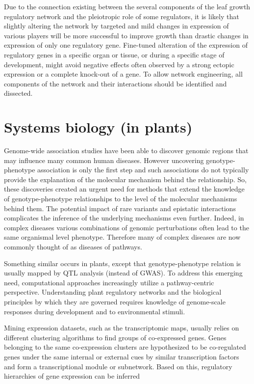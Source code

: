 \documentclass[a4paper,10pt]{article}
\begin{document}
\begin{description}
Due to the connection existing between the several components of the leaf growth regulatory network and the pleiotropic role of some regulators,
it is likely that slightly altering the network by targeted and mild changes in expression of various players will be more successful to improve growth than drastic changes in expression of only one regulatory gene. 
Fine-tuned alteration of the expression of regulatory genes in a specific organ or tissue, or during a specific stage of development, might avoid negative effects often observed by a strong ectopic expression or a complete knock-out of a gene.
To allow network engineering, all components of the network and their interactions should be identified and dissected.


\end{description}


\section{Systems biology (in plants)}
Genome-wide association studies have been able to discover genomic regions that may influence many common human diseases. 
However uncovering genotype-phenotype association is only the first step and such associations do not typically provide the explanation of the molecular mechanism behind the relationship.
So, these discoveries created an urgent need for methods that extend the knowledge of genotype-phenotype relationships to the level of the molecular mechanisms behind them.
The potential impact of rare variants and epistatic interactions complicates the inference of the underlying mechanisms even further.
Indeed, in complex diseases various combinations of genomic perturbations often lead to the same organismal level phenotype. Therefore many of complex diseases are now commonly thought of as diseases of pathways.

Something similar occurs in plants, except that genotype-phenotype relation is usually mapped by QTL analysis (instead of GWAS).
To address this emerging need, computational approaches increasingly utilize a pathway-centric perspective.
Understanding plant regulatory networks and the biological principles by which they are governed requires knowledge of genome-scale responses during development and to environmental stimuli.

Mining expression datasets, such as the transcriptomic maps, usually relies on different clustering algorithms to find groups of co-expressed genes. 
Genes belonging to the same co-expression clusters are hypothesized to be co-regulated genes under the same internal or external cues by similar transcription factors and form a transcriptional module or subnetwork.
Based on this, regulatory hierarchies of gene expression can be inferred
\end{document}
